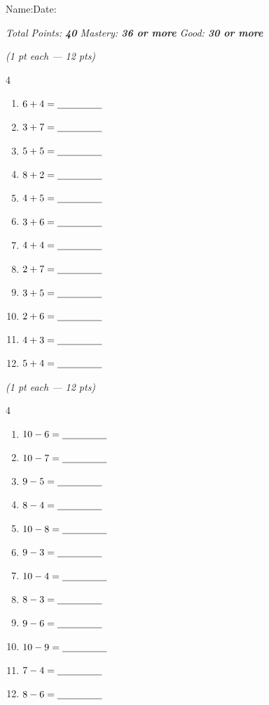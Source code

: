 \documentclass[12pt, letterpaper]{article}
\begin{document}

{\small Name:\ansblanklg \hfill Date:\ansblank}
\goldrule

\begin{center}
\textit{Total Points: \textbf{40} \hfill Mastery: \textbf{36 or more} \hfill Good: \textbf{30 or more}}
\end{center}

\bigskip
{} \hfill \textit{(1 pt each — 12 pts)}

\bigskip
\begin{multicols}{4}
\begin{enumerate}[leftmargin=*,label=\textbf{\arabic*.},itemsep=10pt]
  \item $6+4=\underline{\hspace{1.6cm}}$
  \item $3+7=\underline{\hspace{1.6cm}}$
  \item $5+5=\underline{\hspace{1.6cm}}$
  \item $8+2=\underline{\hspace{1.6cm}}$
  \item $4+5=\underline{\hspace{1.6cm}}$
  \item $3+6=\underline{\hspace{1.6cm}}$
  \item $4+4=\underline{\hspace{1.6cm}}$
  \item $2+7=\underline{\hspace{1.6cm}}$
  \item $3+5=\underline{\hspace{1.6cm}}$
  \item $2+6=\underline{\hspace{1.6cm}}$
  \item $4+3=\underline{\hspace{1.6cm}}$
  \item $5+4=\underline{\hspace{1.6cm}}$
\end{enumerate}
\end{multicols}

\bigskip\bigskip
{} \hfill \textit{(1 pt each — 12 pts)}

\bigskip
\begin{multicols}{4}
\begin{enumerate}[leftmargin=*,label=\textbf{\arabic*.},itemsep=10pt,start=13]
  \item $10-6=\underline{\hspace{1.6cm}}$
  \item $10-7=\underline{\hspace{1.6cm}}$
  \item $9-5=\underline{\hspace{1.6cm}}$
  \item $8-4=\underline{\hspace{1.6cm}}$
  \item $10-8=\underline{\hspace{1.6cm}}$
  \item $9-3=\underline{\hspace{1.6cm}}$
  \item $10-4=\underline{\hspace{1.6cm}}$
  \item $8-3=\underline{\hspace{1.6cm}}$
  \item $9-6=\underline{\hspace{1.6cm}}$
  \item $10-9=\underline{\hspace{1.6cm}}$
  \item $7-4=\underline{\hspace{1.6cm}}$
  \item $8-6=\underline{\hspace{1.6cm}}$
\end{enumerate}
\end{multicols}
\end{document}

